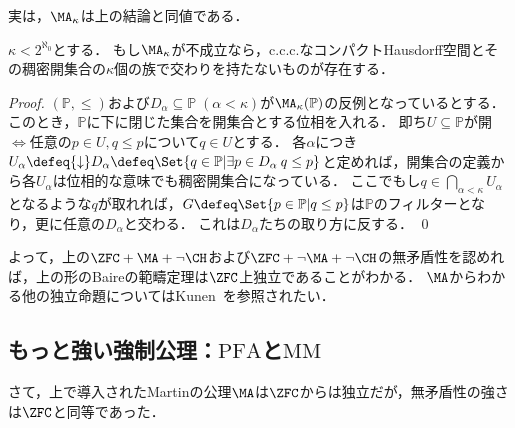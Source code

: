 \documentclass[a4j,leqno]{ltjsarticle}
\begin{document}
実は，$\MA_\kappa$は上の結論と同値である．

\begin{theorem}
 $\kappa < 2^{\aleph_0}$とする．
 もし$\MA_{\kappa}$が不成立なら，c.c.c.なコンパクトHausdorff空間とその稠密開集合の$\kappa$個の族で交わりを持たないものが存在する．
\end{theorem}
\begin{proof}
 $(\mathbb{P}, {\leq})$および$D_\alpha \subseteq \mathbb{P}\; (\alpha < \kappa)$が$\MA_\kappa(\mathbb{P})$の反例となっているとする．
 このとき，$\mathbb{P}$に下に閉じた集合を開集合とする位相を入れる．
 即ち$U \subseteq \mathbb{P}$が開$\iff$任意の$p \in U, q \leq p$について$q \in U$とする．
 各$\alpha$につき$U_\alpha \defeq {\downarrow}D_\alpha \defeq \Set{q \in \mathbb{P} | \exists p \in D_\alpha \: q \leq p}$と定めれば，開集合の定義から各$U_\alpha$は位相的な意味でも稠密開集合になっている．
 ここでもし$q \in \bigcap_{\alpha < \kappa} U_\alpha$となるような$q$が取れれば，$G \defeq \Set{p \in \mathbb{P} | q \leq p}$は$\mathbb{P}$のフィルターとなり，更に任意の$D_\alpha$と交わる．
 これは$D_\alpha$たちの取り方に反する． \qed
\end{proof}

よって，上の$\ZFC+\MA+\neg\CH$および$\ZFC+\neg\MA+\neg\CH$の無矛盾性を認めれば，上の形のBaireの範疇定理は$\ZFC$上独立であることがわかる．
$\MA$からわかる他の独立命題についてはKunen~\cite{Kunen:2011}を参照されたい．

\subsection{もっと強い強制公理：$\mathrm{PFA}$と$\mathrm{MM}$}
さて，上で導入されたMartinの公理$\MA$は$\ZFC$からは独立だが，無矛盾性の強さは$\ZFC$と同等であった．
\end{document}

